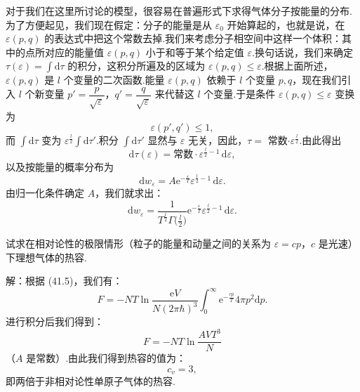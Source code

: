 对于我们在这里所讨论的模型，很容易在普遍形式下求得气体分子按能量的分布.为了方便起见，我们现在假定：分子的能量是从 $\varepsilon_0$ 开始算起的，也就是说，在 $\varepsilon(p,q)$ 的表达式中把这个常数去掉.我们来考虑分子相空间中这样一个体积：其中的点所对应的能量值 $\varepsilon(p,q)$ 小于和等于某个给定值 $\varepsilon$.换句话说，我们来确定 $\tau(\varepsilon)=\int\mathrm{d}\tau$ 的积分，这积分所遍及的区域为 $\varepsilon(p,q)\leqslant\varepsilon$.根据上面所述，$\varepsilon(p,q)$ 是 $l$ 个变量的二次函数.能量 $\varepsilon(p,q)$ 依赖于 $l$ 个变量 $p,q$，现在我们引入 $l$ 个新变量 $p'=\dfrac{p}{\sqrt{\varepsilon}}$，$q'=\dfrac{q}{\sqrt{\varepsilon}}$ 来代替这 $l$ 个变量.于是条件 $\varepsilon(p,q)\leqslant\varepsilon$ 变换为
\begin{equation*}
  \varepsilon(p',q')\leqslant1,
\end{equation*}
而 $\int\mathrm{d}\tau$ 变为 $\varepsilon^{\frac{l}{2}}\int\mathrm{d}\tau'$.积分 $\int\mathrm{d}\tau'$ 显然与 $\varepsilon$ 无关，因此，$\tau=$ 常数$\cdot\varepsilon^{\frac{l}{2}}$.由此得出
\begin{equation*}
  \mathrm{d}\tau(\varepsilon)=\text{常数}\cdot\varepsilon^{\frac{l}{2}-1}\,\mathrm{d}\varepsilon,
\end{equation*}
以及按能量的概率分布为
\begin{equation*}
  \mathrm{d}w_{\varepsilon}=A\mathrm{e}^{-\frac{\varepsilon}{T}}\varepsilon^{\frac{l}{2}-1}\,\mathrm{d}\varepsilon.
\end{equation*}
由归一化条件确定 $A$，我们就求出：
\begin{equation}
  \mathrm{d}w_{\varepsilon}
  =\frac{1}{T^{\frac{l}{2}}\Gamma\Big(\frac{l}{2}\Big)}
  \mathrm{e}^{-\frac{\varepsilon}{T}}\varepsilon^{\frac{l}{2}-1}\,\mathrm{d}\varepsilon.
\end{equation}

\begin{xiti}

\quad 试求在相对论性的极限情形（粒子的能量和动量之间的关系为 $\varepsilon=cp$，$c$ 是光速）下理想气体的热容.

解：根据 (41.5)，我们有：
\begin{equation*}
  F=-NT\ln\frac{\mathrm{e}V}{N(2\pi\hbar)^3}
  \int_0^{\infty}\mathrm{e}^{-\frac{cp}{T}}4\pi p^2\mathrm{d}p.
\end{equation*}
进行积分后我们得到：
\begin{equation*}
  F=-NT\ln\frac{AVT^3}{N}
\end{equation*}
（$A$ 是常数）.由此我们得到热容的值为：
\begin{equation*}
  c_v=3,
\end{equation*}
即两倍于非相对论性单原子气体的热容.

\end{xiti}

